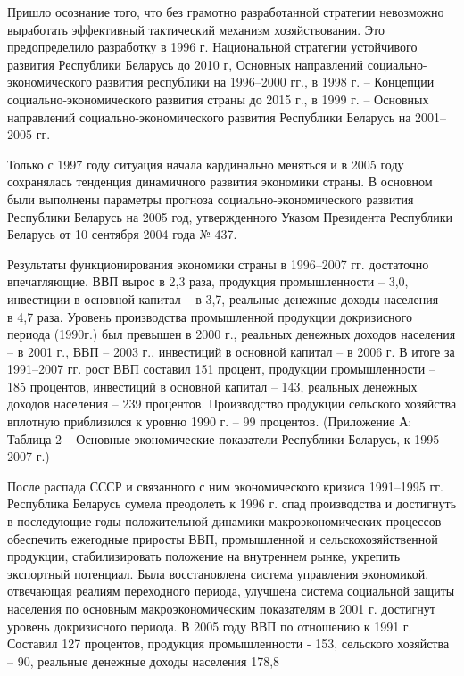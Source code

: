 \documentclass[14pt,a4paper]{article}
\begin{document}
    Пришло осознание того, что без грамотно разработанной стратегии невозможно выработать эффективный тактический механизм хозяйствования.
    Это предопределило разработку в 1996 г. Национальной стратегии устойчивого развития Республики Беларусь до 2010 г, Основных направлений социально-экономического развития республики на 1996--2000 гг., в 1998 г. – Концепции социально-экономического развития страны до 2015 г., в 1999 г. – Основных направлений социально-экономического развития Республики Беларусь на 2001--2005 гг.
    \par
    Только с 1997 году ситуация начала кардинально меняться и в 2005 году сохранялась тенденция динамичного развития экономики страны.
    В основном были выполнены параметры прогноза социально-экономического развития Республики Беларусь на 2005 год, утвержденного Указом Президента Республики Беларусь от 10 сентября 2004 года № 437.
    \par
    Результаты функционирования экономики страны в 1996--2007 гг. достаточно впечатляющие.
    ВВП вырос в 2,3 раза, продукция промышленности – 3,0, инвестиции в основной капитал – в 3,7, реальные денежные доходы населения – в 4,7 раза.
    Уровень производства промышленной продукции докризисного периода (1990г.) был превышен в 2000 г., реальных денежных доходов населения – в 2001 г., ВВП – 2003 г., инвестиций в основной капитал – в 2006 г.
    В итоге за 1991--2007 гг. рост ВВП составил 151 процент, продукции промышленности – 185 процентов, инвестиций в основной капитал – 143, реальных денежных доходов населения – 239 процентов.
    Производство продукции сельского хозяйства вплотную приблизился к уровню 1990 г. – 99 процентов. (Приложение А: Таблица 2 – Основные экономические показатели Республики Беларусь, к 1995--2007 г.)
    \\
    \par
    После распада СССР и связанного с ним экономического кризиса 1991--1995 гг. Республика Беларусь сумела преодолеть к 1996 г. спад производства и достигнуть в последующие годы положительной динамики макроэкономических процессов – обеспечить ежегодные приросты ВВП, промышленной и сельскохозяйственной продукции, стабилизировать положение на внутреннем рынке, укрепить экспортный потенциал.
    Была восстановлена система управления экономикой, отвечающая реалиям переходного периода, улучшена система социальной защиты населения по основным макроэкономическим показателям в 2001 г. достигнут уровень докризисного периода.
    В 2005 году ВВП по отношению к 1991 г.
    Составил 127 процентов, продукция промышленности - 153, сельского хозяйства – 90, реальные денежные доходы населения 178,8
\end{document}
